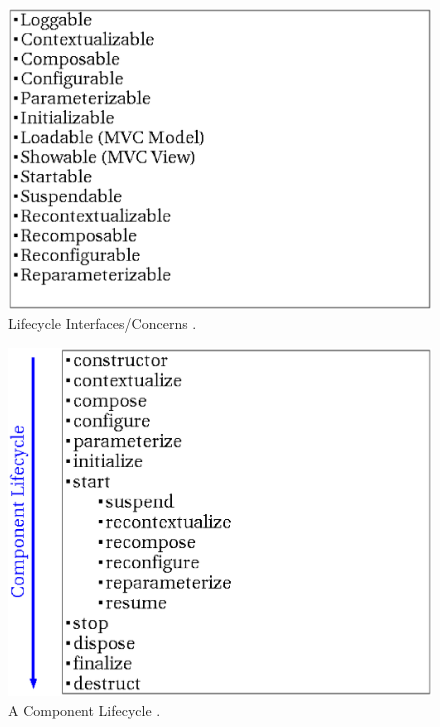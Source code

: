 \documentclass[a4paper,10pt]{llncs}
\begin{document}
\begin{figure}[ht]
\begin{center}
\includegraphics[scale=0.3]{lifecycle_interfaces_concerns_avalon}
\caption{Lifecycle Interfaces/Concerns \cite{jakarta}.}
\label{fig:lifecycle_interfaces_concerns_avalon}
\end{center}
\end{figure}

\begin{figure}[ht]
\begin{center}
\includegraphics[scale=0.3]{a_component_lifecycle_avalon}
\caption{A Component Lifecycle \cite{jakarta}.}
\label{fig:a_component_lifecycle_avalon}
\end{center}
\end{figure}
\end{document}
